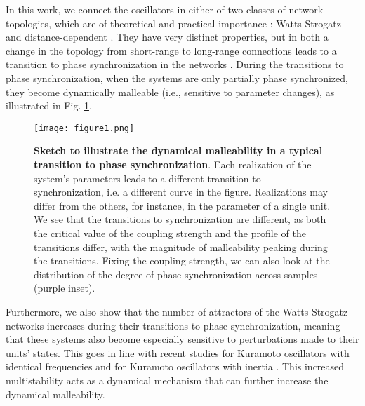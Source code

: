 In this work, we connect the oscillators in either of two classes of network topologies, which are of theoretical and practical importance \cite{albert2002statistical}: Watts-Strogatz \cite{watts1998collective, humphries2008network, telesford2011the} and distance-dependent \cite{rogers1996phasetransitions, rubinov2015wiring}. They have very distinct properties, but in both a change in the topology from short-range to long-range connections leads to a transition to phase synchronization in the networks \cite{hong2002synchronization, rogers1996phasetransitions}. During the transitions to phase synchronization, when the systems are only partially phase synchronized, they become dynamically malleable (i.e., sensitive to parameter changes), as illustrated in Fig. \ref{fig:sketchmalleability}. 
%
\begin{figure}[htb!]
    \centering
    \texttt{[image: figure1.png]}
    \caption{\textbf{Sketch to illustrate the dynamical malleability in a typical transition to phase synchronization}. Each realization of the system's parameters leads to a different transition to synchronization, i.e. a different curve in the figure. Realizations may differ from the others, for instance, in the parameter of a single unit. We see that the transitions to synchronization are different, as both the critical value of the coupling strength and the profile of the transitions differ, with the magnitude of malleability peaking during the transitions. Fixing the coupling strength, we can also look at the distribution of the degree of phase synchronization across samples (purple inset).}
  \label{fig:sketchmalleability}
\end{figure}

Furthermore, we also show that the number of attractors of the Watts-Strogatz networks increases during their transitions to phase synchronization, meaning that these systems also become especially sensitive to perturbations made to their units' states. This goes in line with recent studies for Kuramoto oscillators with identical frequencies \cite{taylor2012there, zhang2021basins, townsend2020dense} and for Kuramoto oscillators with inertia \cite{gelbrecht2020monte}. This increased multistability acts as a dynamical mechanism that can further increase the dynamical malleability. 

